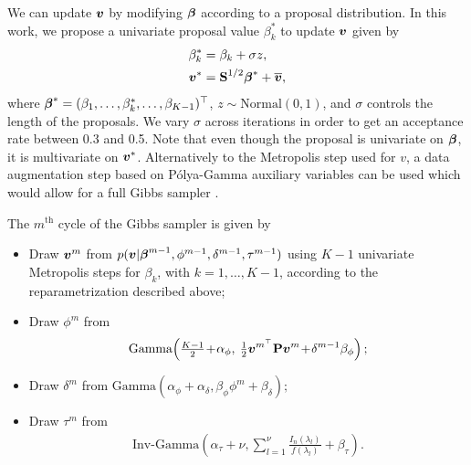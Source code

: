 \documentclass[twocolumn,final]{svjour3}
\newcommand{\bm}[1]{\mbox{\boldmath $#1$}}
\begin{document}
We can update $\bm{v}$ by modifying $\bm{\beta}$ according to a proposal distribution.  In this work, we propose a univariate proposal value $\beta_{k}^{*}$ to update $\bm{v}$ given by
\begin{align*}
\beta_{k}^{*} &= \beta_{k} + \sigma z,\\
\bm{v}^{*} &= \textbf{S}^{1/2}\bm{\beta}^{*} + \overline{\bm{v}}, 
\end{align*}
where $\bm{\beta}^{*}= (\beta_1, \dots, \beta_{k}^{*} ,\dots, \beta_{K-1})^\top$, $z \sim \text{Normal}(0,1)$, and $\sigma$ controls the length of the proposals.  We vary $\sigma$ across iterations in order to get an acceptance rate between 0.3 and 0.5.  Note that even though the proposal is univariate on $\bm{\beta}$, it is multivariate on $\bm{v}^*$.
Alternatively to the Metropolis step used for \bm{v}, a data augmentation step based on P\'olya-Gamma auxiliary variables can be used which would allow for a full Gibbs sampler \citep{Polson:2013}. 

The $m^{\text{th}}$ cycle of the Gibbs sampler is given by
\begin{itemize}
	\item Draw $\bm{v}^{m}$ from $p(\bm{v}|\bm{\beta}^{m-1},\phi^{m-1},\delta^{m-1},\tau^{m-1})$ using $K-1$ univariate Metropolis steps for $\beta_k$, with $k=1,\dots,K-1$, according to the reparametrization described above;
	\item Draw $\phi^{m}$ from 
	\begin{align*}
	\text{Gamma}\!\left(\tfrac{K-1}{2}\!+\!\alpha_{\phi},\: \tfrac{1}{2} \bm{v}^{m^\top} \textbf{P} \bm{v}^{m}\!+\!\delta^{m-1} \beta_{\phi} \right);
	\end{align*}
	
	\item Draw $\delta^{m}$ from $\text{Gamma}\left(\alpha_{\phi} + \alpha_{\delta}, \beta_{\phi} \phi^{m} + \beta_{\delta}\right);$ 
	\item Draw $\tau^{m}$ from 
	\begin{align*}
	\text{Inv-Gamma}\!\left(\alpha_{\tau}\!+\!\nu, {\textstyle\sum\limits_{l=1}^{\nu}} \tfrac{I_n(\lambda_l)}{f(\lambda_l)} + \beta_{\tau} \right) .
	\end{align*}
\end{itemize}
\end{document}
